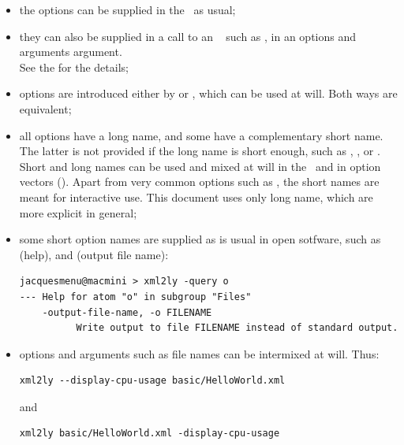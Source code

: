 \begin{itemize}
\item the options can be supplied in the \CLI\ as usual;

  \item they can also be supplied in a call to an \API\  such as , in an options and arguments argument. \\
    		See the  for the details;


\item options are introduced either by \code{-} or \code{--}, which can be used at will. Both ways are equivalent;

\item all options have a long name, and some have a complementary short name.
 The latter is not provided if the long name is short enough, such as , ,  or .\\
    Short and long names can be used and mixed at will in the \CLI\ and in option vectors (\API).
    Apart from very common options such as , the short names are meant for interactive use. This document uses only long name, which are more explicit in general;

\item some short option names are supplied as is usual in open sotfware, such as  (help), and  (output file name):
\begin{lstlisting}[language=Terminal]
jacquesmenu@macmini > xml2ly -query o
--- Help for atom "o" in subgroup "Files"
    -output-file-name, -o FILENAME
          Write output to file FILENAME instead of standard output.
\end{lstlisting}

\item options and arguments such as file names can be intermixed at will. Thus:
\begin{lstlisting}[language=Terminal]
xml2ly --display-cpu-usage basic/HelloWorld.xml
\end{lstlisting}
and
\begin{lstlisting}[language=Terminal]
xml2ly basic/HelloWorld.xml -display-cpu-usage
\end{lstlisting}


\end{itemize}
